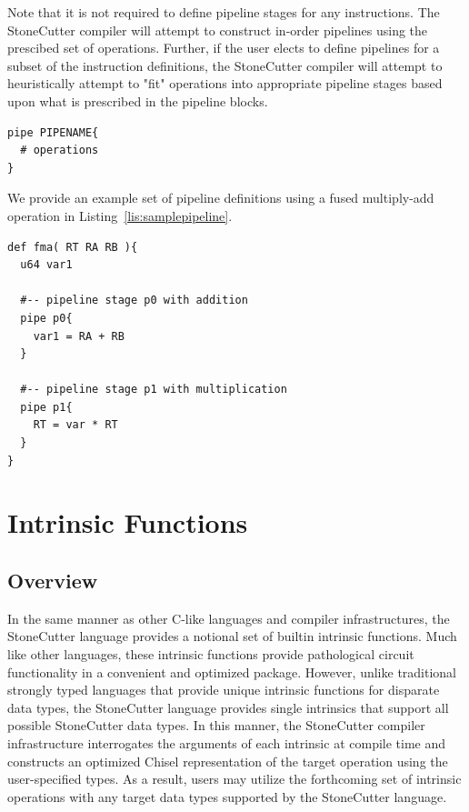 \documentclass{article}
\begin{document}
Note that it is not required to define pipeline stages for any instructions.  The StoneCutter 
compiler will attempt to construct in-order pipelines using the prescibed set of operations.  Further, 
if the user elects to define pipelines for a subset of the instruction definitions, the 
StoneCutter compiler will attempt to heuristically attempt to "fit" operations 
into appropriate pipeline stages based upon what is prescribed in the pipeline blocks.

\vspace{0.125in}
\begin{lstlisting}[frame=single,style=base,caption={Pipeline Syntax},captionpos=b,label={lis:pipelinesyntax}]
pipe PIPENAME{
  # operations
}
\end{lstlisting}

We provide an example set of pipeline definitions using a fused multiply-add operation in Listing~\ref{lis:samplepipeline}.

\vspace{0.125in}
\begin{lstlisting}[frame=single,style=base,caption={Sample Pipeline},captionpos=b,label={lis:samplepipeline}]
def fma( RT RA RB ){
  u64 var1

  #-- pipeline stage p0 with addition
  pipe p0{
    var1 = RA + RB
  }

  #-- pipeline stage p1 with multiplication
  pipe p1{
    RT = var * RT
  }
}
\end{lstlisting}


\clearpage
\section{Intrinsic Functions}
\label{sec:IntrinsicFunctions}

\subsection{Overview}
\label{sec:IntrinsicOverview}

In the same manner as other C-like languages and compiler infrastructures, 
the StoneCutter language provides a notional set of builtin intrinsic functions.  
Much like other languages, these intrinsic functions provide pathological 
circuit functionality in a convenient and optimized package.  However, 
unlike traditional strongly typed languages that provide unique intrinsic 
functions for disparate data types, the StoneCutter language provides 
single intrinsics that support all possible StoneCutter data types.  In this manner, 
the StoneCutter compiler infrastructure interrogates the arguments of each intrinsic 
at compile time and constructs an optimized Chisel representation of the target 
operation using the user-specified types.  As a result, users may utilize the forthcoming 
set of intrinsic operations with any target data types supported by the StoneCutter language.  
\end{document}

